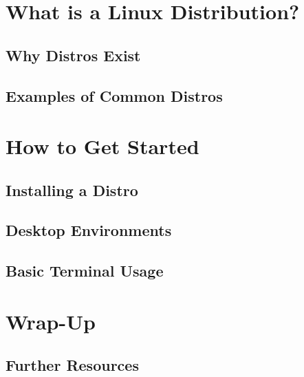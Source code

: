 \documentclass[12pt, a4paper, oneside]{article}
\begin{document}
	\section{What is a Linux Distribution?}
	\subsection{Why Distros Exist}
	\subsection{Examples of Common Distros}
	
	\section{How to Get Started}
	\subsection{Installing a Distro}
	\subsection{Desktop Environments}
	\subsection{Basic Terminal Usage}
	
	\section{Wrap-Up}
	\subsection{Further Resources}
\end{document}
